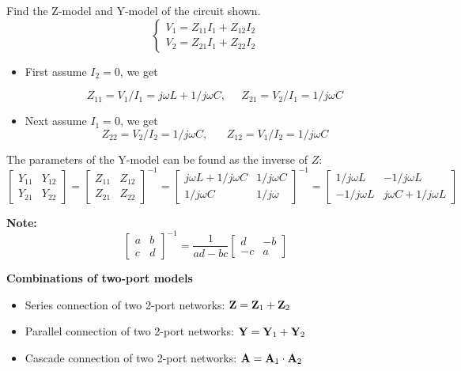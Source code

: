 Find the Z-model and Y-model of the circuit shown.
\[ \left\{ \begin{array}{l} V_1=Z_{11}I_1+Z_{12}I_2 \\
	V_2=Z_{21}I_1+Z_{22}I_2 \end{array} \right.
\]
\begin{itemize}
\item First assume $I_2=0$, we get

\[ Z_{11}=V_1/I_1=j\omega L+1/j\omega C,\;\;\;\;\;Z_{21}=V_2/I_1=1/j\omega C \]
\item Next assume $I_1=0$, we get
\[ Z_{22}=V_2/I_2=1/j\omega C,\;\;\;\;\;\;Z_{12}=V_1/I_2=1/j\omega C \]
\end{itemize}
The parameters of the Y-model can be found as the inverse of $Z$:
\[ \left[\begin{array}{cc}Y_{11}&Y_{12}\\Y_{21}&Y_{22}\end{array}\right]
  =\left[\begin{array}{cc}Z_{11}&Z_{12}\\Z_{21}&Z_{22}\end{array}\right]^{-1}
  =\left[\begin{array}{cc}j\omega L+1/j\omega C & 1/j\omega C\\
	1/j\omega C & 1/j\omega \end{array}\right]^{-1}
  =\left[\begin{array}{cc}1/j\omega L & -1/j\omega L\\
	-1/j\omega L & j\omega C+1/j\omega L\end{array}\right] \]
	
{\bf Note:} 
\[	 \left[ \begin{array}{rr} a & b \\ c & d \end{array} \right]^{-1}
=\frac{1}{ad-bc}\left[ \begin{array}{rr} d & -b \\ -c & a \end{array} \right]
\]

{\bf Combinations of two-port models}

\begin{itemize}
\item Series connection of two 2-port networks: 
	${\bf Z}={\bf Z}_1+{\bf Z}_2$
\item Parallel connection of two 2-port networks: 
	${\bf Y}={\bf Y}_1+{\bf Y}_2$
\item Cascade connection of two 2-port networks:
	${\bf A}={\bf A}_1 \cdot {\bf A}_2$
\end{itemize}


